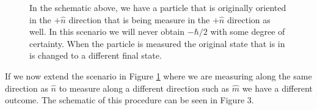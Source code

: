 \documentclass[twocolumn]{article}
\begin{document}
\begin{figure}[ht]
    \centering
    \newcommand{\figtwocircrad}{0.25}
    \newcommand{\figtwolineaxstart}{2*\figtwocircrad}
    \newcommand{\figtwolineaxend}{\figtwolineaxstart + 1.25}
    \newcommand{\figtworectheight}{3*\figtwocircrad}
    \newcommand{\figtworectwidth}{2.5}
    \newcommand{\figtworectx}{\figtwolineaxend}
    \newcommand{\figtworecty}{-0.5*\figtworectheight}
    \newcommand{\figtwolinebxstart}{\figtworectx + \figtworectwidth}
    \newcommand{\figtwolinebxend}{\figtworectx + \figtworectwidth + 1.25}
    \caption{\footnotesize{In the schematic above, we have a particle that is originally oriented in the $+\hat{n}$ direction that is being measure in the $+\hat{n}$ direction as well. In this scenario we will never obtain $-\hbar/2$ with some degree of certainty. When the particle is measured the original state that is in is changed to a different final state.}}
    \label{Fig: SC}
\end{figure}
\par \noindent
If we now extend the scenario in Figure \ref{Fig: SC} where we are measuring along the same direction as $\hat{n}$ to measure along a different direction such as $\hat{m}$ we have a different outcome. The schematic of this procedure can be seen in Figure 3.
\end{document}
